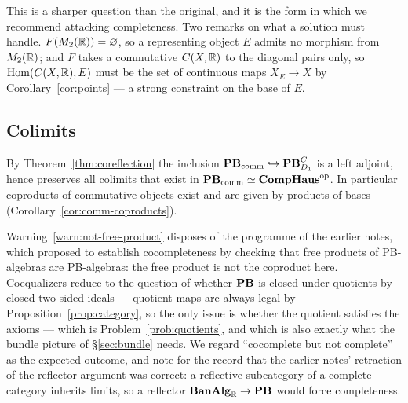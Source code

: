 This is a sharper question than the original, and it is the form in which we
recommend attacking completeness.  Two remarks on what a solution must handle.
$F(M_2(\mathbb{R}))=\varnothing$, so a representing object $E$ admits no morphism from
$M_2(\mathbb{R})$; and $F$ takes a commutative $C(X,\mathbb{R})$ to the diagonal pairs only,
so $\operatorname{Hom}(C(X,\mathbb{R}),E)$ must be the set of continuous maps $X_E\to X$ by
Corollary~\ref{cor:points} --- a strong constraint on the base of $E$.

\subsection{Colimits}

\begin{proposition}\label{prop:comm-colimits}
By Theorem~\ref{thm:coreflection} the inclusion
$\mathbf{PB}_{\mathrm{comm}}\hookrightarrow\mathbf{PB}^C_{D_1}$ is a left adjoint, hence preserves all
colimits that exist in $\mathbf{PB}_{\mathrm{comm}}\simeq\mathbf{CompHaus}^{\mathrm{op}}$.  In particular coproducts of
commutative objects exist and are given by products of bases
(Corollary~\ref{cor:comm-coproducts}).
\end{proposition}

\begin{remark}
Warning~\ref{warn:not-free-product} disposes of the programme of the earlier
notes, which proposed to establish cocompleteness by checking that free products
of PB-algebras are PB-algebras: the free product is not the coproduct here.
Coequalizers reduce to the question of whether $\mathbf{PB}$ is closed under quotients
by closed two-sided ideals --- quotient maps are always legal by
Proposition~\ref{prop:category}, so the only issue is whether the quotient
satisfies the axioms --- which is Problem~\ref{prob:quotients}, and which is
also exactly what the bundle picture of \S\ref{sec:bundle} needs.  We regard
``cocomplete but not complete'' as the expected outcome, and note for the record
that the earlier notes' retraction of the reflector argument was correct: a
reflective subcategory of a complete category inherits limits, so a reflector
$\mathbf{BanAlg}_{\mathbb{R}}\to\mathbf{PB}$ would force completeness.
\end{remark}
